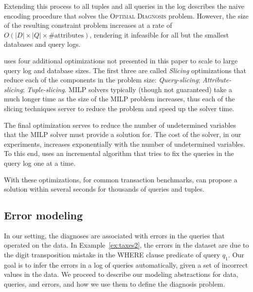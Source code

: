 Extending this process to all tuples and all queries in the log 
describes the naive encoding procedure that solves the
\textsc{Optimal Diagnosis} problem.
However, the size of the resulting constraint problem increases 
at a rate of $O(|D|\times |Q|\times \mathrm{\#attributes})$, rendering
it infeasible for all but the smallest databases and query logs.


\sys uses four additional optimizations not presented in this paper 
to scale to large query log and database sizes.  The first three are
called {\it Slicing} optimizations that reduce each of the components in the problem size:
{\it Query-slicing}; {\it Attribute-slicing}; {\it Tuple-slicing}. 
MILP solvers typically (though not guaranteed) take a much longer time as the size of the MILP problem increases, thus
each of the slicing techniques server to reduce the problem and speed up the solver time.

The final optimization serves to reduce the number of undetermined variables that the MILP solver must
provide a solution for.  The cost of the solver, in our experiments, increases exponentially with the number of 
undetermined variables.  To this end, \sys uses an incremental algorithm that tries to fix the queries in the query
log one at a time.

With these optimizations, for common transaction benchmarks, \sys can propose a solution within several seconds
for thousands of queries and tuples.


















% 

\subsection{Error modeling}
\label{sec:model}

In our setting, the diagnoses are associated with errors in the queries that
operated on the data. In Example~\ref{ex:taxes2}, the errors in the dataset
are due to the digit transposition mistake in the WHERE clause predicate of
query $q_1$. Our goal is to infer the errors in a log of queries
automatically, given a set of incorrect values in the data. We proceed to
describe our modeling abstractions for data, queries, and errors, and how we
use them to define the diagnosis problem.

